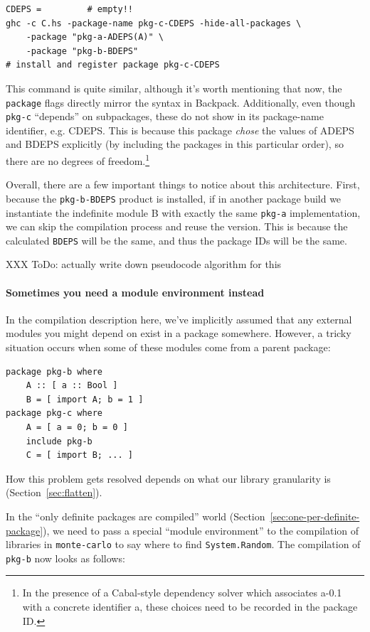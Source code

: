 \documentclass{article}
\begin{document}
\begin{verbatim}
CDEPS =         # empty!!
ghc -c C.hs -package-name pkg-c-CDEPS -hide-all-packages \
    -package "pkg-a-ADEPS(A)" \
    -package "pkg-b-BDEPS"
# install and register package pkg-c-CDEPS
\end{verbatim}

This command is quite similar, although it's worth mentioning that now,
the \verb|package| flags directly mirror the syntax in Backpack.
Additionally, even though \verb|pkg-c| ``depends'' on subpackages, these
do not show in its package-name identifier, e.g. CDEPS\@.  This is
because this package \emph{chose} the values of ADEPS and BDEPS
explicitly (by including the packages in this particular order), so
there are no degrees of freedom.\footnote{In the presence of a
    Cabal-style dependency solver which associates a-0.1 with a concrete
identifier a, these choices need to be recorded in the package ID.}

Overall, there are a few important things to notice about this architecture.
First, because the \verb|pkg-b-BDEPS| product is installed, if in another package
build we instantiate the indefinite module B with exactly the same \verb|pkg-a|
implementation, we can skip the compilation process and reuse the version.
This is because the calculated \verb|BDEPS| will be the same, and thus the package
IDs will be the same.

XXX ToDo: actually write down pseudocode algorithm for this

\paragraph{Sometimes you need a module environment instead}  In the compilation
description here, we've implicitly assumed that any external modules you might
depend on exist in a package somewhere.  However, a tricky situation
occurs when some of these modules come from a parent package:
\begin{verbatim}
package pkg-b where
    A :: [ a :: Bool ]
    B = [ import A; b = 1 ]
package pkg-c where
    A = [ a = 0; b = 0 ]
    include pkg-b
    C = [ import B; ... ]
\end{verbatim}

How this problem gets resolved depends on what our library granularity is (Section~\ref{sec:flatten}).

In the ``only definite packages are compiled'' world
(Section~\ref{sec:one-per-definite-package}), we need to pass a
special ``module environment'' to the compilation of libraries
in \verb|monte-carlo| to say where to find \verb|System.Random|.
The compilation of \verb|pkg-b| now looks as follows:
\end{document}
